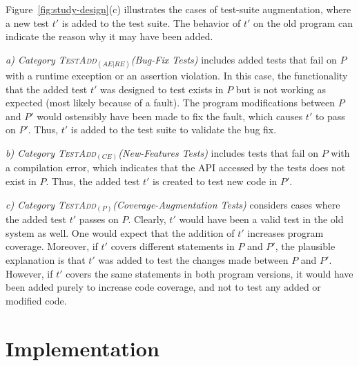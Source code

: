 \documentclass[conference]{IEEEtran}
\newcommand{\lang}[1]{\texttt{\small #1}}
\newcommand{\subject}[1]{\texttt{\small #1}}
\newcommand{\mt}{\mathit}
\newcommand{\cataddaere}{\textsc{TestAdd}$_\mt{(AE|RE)}$}
\newcommand{\cataddce}{\textsc{TestAdd}$_\mt{(CE)}$}
\newcommand{\cataddp}{\textsc{TestAdd}$_\mt{(P)}$}
\begin{document}
Figure~\ref{fig:study-design}(c) illustrates the cases of test-suite
augmentation, where a new test $t'$ is added to the test suite. The
behavior of $t'$ on the old program can indicate the reason why it may
have been added.

\textit{a) Category \cataddaere (Bug-Fix Tests)} includes added tests
that fail on $P$ with a runtime exception or an assertion
violation. In this case, the functionality that the added test $t'$
was designed to test exists in $P$ but is not working as expected
(most likely because of a fault). The program modifications between
$P$ and $P'$ would ostensibly have been made to fix the fault, which
causes $t'$ to pass on $P'$. Thus, $t'$ is added to the test suite to
validate the bug fix.



\textit{b) Category \cataddce (New-Features Tests)} includes tests
that fail on $P$ with a compilation error, which indicates that the
API accessed by the tests does not exist in $P$. Thus, the added test
$t'$ is created to test new code in $P'$.

\textit{c) Category \cataddp (Coverage-Augmentation Tests)} considers
cases where the added test $t'$ passes on $P$. Clearly, $t'$ would
have been a valid test in the old system as well. One would expect
that the addition of $t'$ increases program coverage. Moreover, if
$t'$ covers different statements in $P$ and $P'$, the plausible
explanation is that $t'$ was added to test the changes made between
$P$ and $P'$. However, if $t'$ covers the same statements in both
program versions, it would have been added purely to increase code
coverage, and not to test any added or modified code.

\section{Implementation}
\label{sec:implementation}
\end{document}
